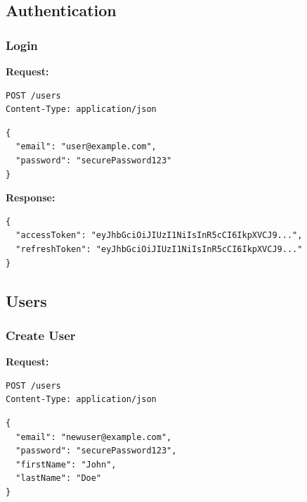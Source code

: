\subsection*{Authentication}

\subsubsection*{Login}

\textbf{Request:}

\begin{tcolorbox}[width=\textwidth, boxrule=0.5pt, colback=gray!5, colframe=gray!50]
\begin{verbatim}
POST /users
Content-Type: application/json
\end{verbatim}

\begin{verbatim}
{
  "email": "user@example.com",
  "password": "securePassword123"
}
\end{verbatim}
\end{tcolorbox}

\vspace{1em}
\textbf{Response:}

\begin{tcolorbox}[width=\textwidth, boxrule=0.5pt, colback=gray!5, colframe=gray!50]
\begin{verbatim}
{
  "accessToken": "eyJhbGciOiJIUzI1NiIsInR5cCI6IkpXVCJ9...",
  "refreshToken": "eyJhbGciOiJIUzI1NiIsInR5cCI6IkpXVCJ9..."
}
\end{verbatim}
\end{tcolorbox}

\subsection*{Users}

\subsubsection*{Create User}

\textbf{Request:}

\begin{tcolorbox}[width=\textwidth, boxrule=0.5pt, colback=gray!5, colframe=gray!50]
\begin{verbatim}
POST /users
Content-Type: application/json
\end{verbatim}

\begin{verbatim}
{
  "email": "newuser@example.com",
  "password": "securePassword123",
  "firstName": "John",
  "lastName": "Doe"
}
\end{verbatim}
\end{tcolorbox}

